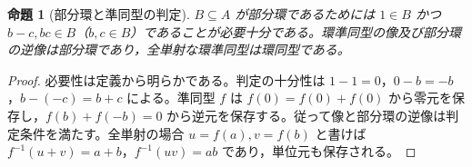 \documentclass[a5paper,10pt,dvipdfmx]{jsarticle}
\theoremstyle{definition}
\theoremstyle{plain}
\newtheorem{prop}[ruledef]{命題}
\begin{document}
\begin{prop}[部分環と準同型の判定]\label{k252}
$B\subseteq A$ が部分環であるためには $1\in B$ かつ $b-c,bc\in B$（$b,c\in B$）であることが必要十分である。環準同型の像及び部分環の逆像は部分環であり，全単射な環準同型は環同型である。
\end{prop}
\begin{proof}
必要性は定義から明らかである。判定の十分性は $1-1=0$，$0-b=-b$，$b-(-c)=b+c$ による。準同型 $f$ は $f(0)=f(0)+f(0)$ から零元を保存し，$f(b)+f(-b)=0$ から逆元を保存する。従って像と部分環の逆像は判定条件を満たす。全単射の場合 $u=f(a),v=f(b)$ と書けば $f^{-1}(u+v)=a+b$，$f^{-1}(uv)=ab$ であり，単位元も保存される。
\end{proof}
\end{document}
